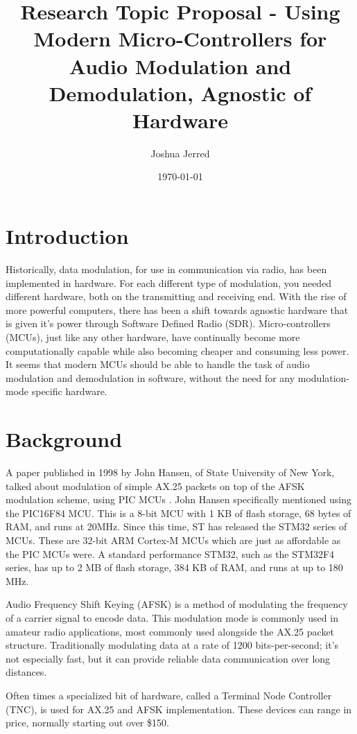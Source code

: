 \documentclass{article}[12pt,a4paper]
\title{Research Topic Proposal - Using Modern Micro-Controllers for Audio Modulation and Demodulation, Agnostic of Hardware}
\author{Joshua Jerred}
\date{\today}
\begin{document}
\maketitle

\section*{Introduction}

Historically, data modulation, for use in communication via radio, has been implemented in hardware. For each different type of modulation, you needed different hardware, both on the transmitting and receiving end. With the rise of more powerful computers, there has been a shift towards agnostic hardware that is given it's power through Software Defined Radio (SDR). Micro-controllers (MCUs), just like any other hardware, have continually become more computationally capable while also becoming cheaper and consuming less power. It seems that modern MCUs should be able to handle the task of audio modulation and demodulation in software, without the need for any modulation-mode specific hardware.

\section*{Background}

A paper published in 1998 by John Hansen, of State University of New York, talked about modulation of simple AX.25 packets on top of the AFSK modulation scheme, using PIC MCUs \cite{hansen_ax25}. John Hansen specifically mentioned using the PIC16F84 MCU. This is a 8-bit MCU with 1 KB of flash storage, 68 bytes of RAM, and runs at 20MHz\cite{pic_datasheet}. Since this time, ST has released the STM32 series of MCUs. These are 32-bit ARM Cortex-M MCUs which are just as affordable as the PIC MCUs were. A standard performance STM32, such as the STM32F4 series, has up to 2 MB of flash storage, 384 KB of RAM, and runs at up to 180 MHz\cite{st_datasheet}.

Audio Frequency Shift Keying (AFSK) is a method of modulating the frequency of a carrier signal to encode data. This modulation mode is commonly used in amateur radio applications, most commonly used alongside the AX.25 packet structure\cite{ax25_spec}. Traditionally modulating data at a rate of 1200 bits-per-second; it's not especially fast, but it can provide reliable data communication over long distances\cite{5167882}.

Often times a specialized bit of hardware, called a Terminal Node Controller (TNC), is used for AX.25 and AFSK implementation. These devices can range in price, normally starting out over \$150.
\end{document}
